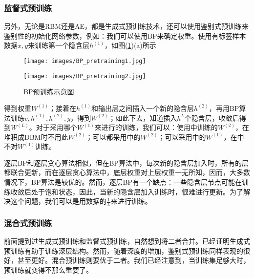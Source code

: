         \subsubsection{监督式预训练}
            \par
            另外，无论是RBM还是AE，都是生成式预训练技术，还可以使用鉴别式预训练来鉴别性的初始化网络参数，例如：我们可以使用BP来确定权重。使用有标签样本数据$x,y$来训练第一个隐含层$h^{(1)}$，如图(\ref{fig:BP预训练示意图})(a)所示
\begin{figure}[H]
  \centering
  \begin{varwidth}[t]{\textwidth}
    \vspace{0pt}
    \texttt{[image: images/BP\_pretraining1.jpg]}
  \end{varwidth}
  \qquad\qquad
  \begin{varwidth}[t]{\textwidth}
    \vspace{0pt}
    \texttt{[image: images/BP\_pretraining2.jpg]}
  \end{varwidth}
  \caption{BP预训练示意图}
  \label{fig:BP预训练示意图}
\end{figure}
            得到权重$W^{(1)}$；接着在$h^{(1)}$和输出层之间插入一个新的隐含层$h^{(2)}$，再用BP算法训练$v,h^{(1)},h^{(2)},y$，得到$W^{(2)}$；如此下去，知道插入$h^L$个隐含层，收敛后得到$W^{(L)}$。对于采用哪个$W^{(1)}$来进行的训练，我们可以：使用中训练的$W^{(2)}$，在堆积成DBM时不用此$W^{(2)}$；可以都采用中的$W^{(2)}$；可以采用中的$W^{(1)}$，在中不对$W^{(1)}$训练。
            \par
            逐层BP和逐层贪心算法相似，但在BP算法中，每次新的隐含层加入时，所有的层都联合更新，而在逐层贪心算法中，底层权重对上层权重一无所知，因而，大多数情况下，BP算法是较优的。然而，逐层BP有一个缺点：一些隐含层节点可能在训练收敛后处于饱和状态，因此，当新的隐含层加入训练时，很难进行更新。为了解决这个问题，我们可以是用数据的$\frac{1}{L}$来进行训练。
        \subsubsection{混合式预训练}
            \par
            前面提到过生成式预训练和监督式预训练，自然想到将二者合并。已经证明生成式预训练有助于训练深层结构。然而，随着深度的增加，鉴别式预训练同样表现的很好，甚至更好。混合预训练则要优于二者。我们已经注意到，当训练集足够大时，预训练就变得不那么重要了。
